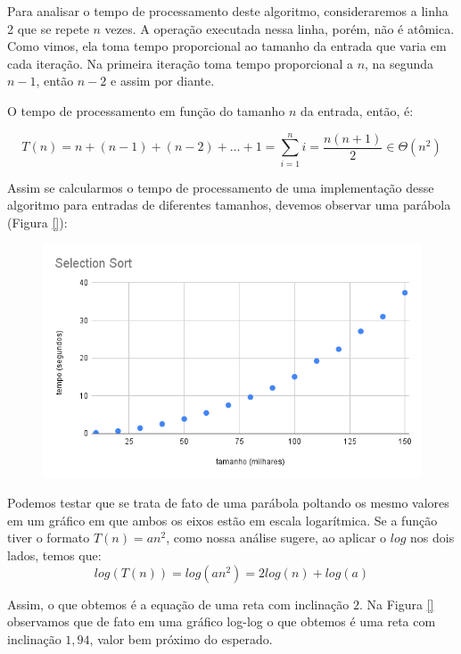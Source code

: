   Para analisar o tempo de processamento deste algoritmo, consideraremos a linha 2 que se repete $n$ vezes.
  A operação executada nessa linha, porém, não é atômica.
  Como vimos, ela toma tempo proporcional ao tamanho da entrada que varia em cada iteração.
  Na primeira iteração toma tempo proporcional a $n$, na segunda $n-1$, então $n-2$ e assim por diante.

  O tempo de processamento em função do tamanho $n$ da entrada, então, é:

  \begin{displaymath}
    T(n) = n + (n-1) + (n-2) + \dots + 1 = \sum_{i=1}^{n}i = \frac{n(n+1)}{2} \in \Theta(n^2)
  \end{displaymath}

  Assim se calcularmos o tempo de processamento de uma implementação desse algoritmo para entradas de diferentes tamanhos, devemos observar uma parábola (Figura \ref{}):

  \begin{figure}
    \includegraphics[width=\textwidth]{imagens/SelectionSort1.png}
  \end{figure}

  Podemos testar que se trata de fato de uma parábola poltando os mesmo valores em um gráfico em que ambos os eixos estão em escala logarítmica.
  Se a função tiver o formato $T(n) = an^2$, como nossa análise sugere, ao aplicar o $log$ nos dois lados, temos que:
  \begin{displaymath}
  log(T(n)) = log(an^2) = 2log(n) + log(a)
  \end{displaymath}
  
  Assim, o que obtemos é a equação de uma reta com inclinação $2$.
  Na Figura \ref{} observamos que de fato em uma gráfico log-log o que obtemos é uma reta com inclinação $1,94$, valor bem próximo do esperado.

